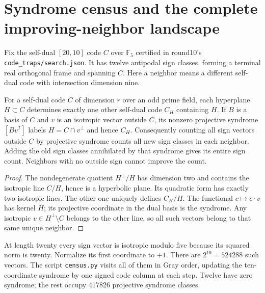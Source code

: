 \section{Syndrome census and the complete improving-neighbor landscape}

Fix the self-dual $[20,10]$ code $C$ over $\mathbb F_5$ certified in
round10's \texttt{code\_traps/search.json}. It has twelve antipodal
sign classes, forming a terminal real orthogonal frame and spanning
$C$. Here a neighbor means a different self-dual code with
intersection dimension nine.

\begin{theorem}
For a self-dual code $C$ of dimension $r$ over an odd prime field,
each hyperplane $H\subset C$ determines exactly one other self-dual
code $C_H$ containing $H$. If $B$ is a basis of $C$ and $v$ is an
isotropic vector outside $C$, its nonzero projective syndrome
$[Bv^T]$ labels $H=C\cap v^\perp$ and hence $C_H$.
Consequently counting all sign vectors outside $C$ by projective
syndrome counts all new sign classes in each neighbor. Adding the
old sign classes annihilated by that syndrome gives its entire
sign count. Neighbors with no outside sign cannot improve the count.
\end{theorem}
\begin{proof}
The nondegenerate quotient $H^\perp/H$ has dimension two and contains
the isotropic line $C/H$, hence is a hyperbolic plane. Its quadratic
form has exactly two isotropic lines. The other one uniquely defines
$C_H/H$. The functional $c\mapsto c\cdot v$ has kernel $H$;
its projective coordinate in the dual basis is the syndrome.
Any isotropic $v\in H^\perp\setminus C$ belongs to the other line,
so all such vectors belong to that same unique neighbor.
\end{proof}
At length twenty every sign vector is isotropic modulo five because
its squared norm is twenty. Normalize its first coordinate to $+1$.
There are $2^{19}=524288$ such vectors. The script \texttt{census.py}
visits all of them in Gray order, updating the ten-coordinate
syndrome by one signed code column at each step. Twelve have zero
syndrome; the rest occupy 417826 projective syndrome classes.

